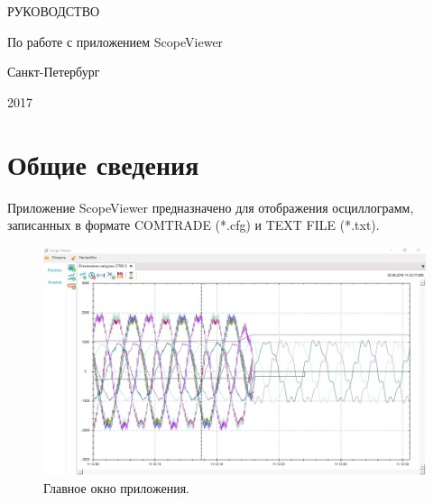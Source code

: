\documentclass[a4paper,12pt]{article}
\begin{document}

\begin{titlepage}
\newpage



\begin{center}
\end{center}

\vspace{40ex}

\begin{center}
\LARGE РУКОВОДСТВО
\end{center}

\begin{center}
\Large По работе с приложением ScopeViewer
\end{center}

\vspace{55ex}

\begin{center}
\Large Санкт-Петербург
\end{center}

\begin{center}
\Large 2017
\end{center}

\end{titlepage}

\section*{\hspace{.5cm}Общие сведения }
\hspace{.5cm}Приложение ScopeViewer предназначено для отображения осциллограмм, записанных в формате COMTRADE (*.cfg) и TEXT FILE (*.txt). 

\begin{figure}[h]
\centering
\includegraphics[width=80ex]{image/MainWindow.jpg}
\caption{Главное окно приложения.}
\end{figure}
\end{document}
